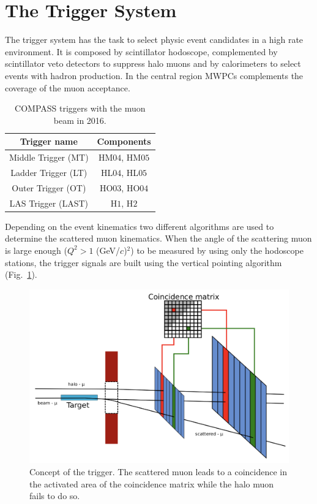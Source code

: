 
\section{The Trigger System}\label{sec:trigger}

The trigger system \cite{TriggerSys} has the task to select physic event candidates in a high rate environment. It is composed by scintillator hodoscope, complemented by scintillator veto detectors to suppress halo muons and by calorimeters to select events with hadron production. In the central region MWPCs complements the coverage of the muon acceptance.

\begin{table}[!h]
  \caption{COMPASS triggers with the muon beam in 2016.}
  \label{tab:kinvar}
  \centering
  \begin{tabularx}{7.5cm}{cc}
    \hline
    \hline
    Trigger name & Components \\
    \hline
    \hline
    Middle Trigger (MT) & HM$04$, HM$05$ \\
    Ladder Trigger (LT) & HL$04$, HL$05$ \\
    Outer Trigger (OT) & HO$03$, HO$04$ \\
    LAS Trigger (LAST) & H$1$, H$2$ \\
    \hline
    \hline
  \end{tabularx}
\end{table}

Depending on the event kinematics two different algorithms are used to determine the scattered muon kinematics. When the angle of the scattering muon is large enough ($Q^2 > 1$ (GeV/$c$)$^2$) to be measured by using only the hodoscope stations, the trigger signals are built using the vertical pointing algorithm (Fig.~\ref{pic:triglogic}).

\begin{figure}[!h]
  \centering
	\includegraphics[scale=0.5]{./gfx/TriggerLogic.png}
	\caption{Concept of the trigger. The scattered muon leads to a coincidence in the activated area of the coincidence matrix while the halo muon fails to do so.}
	\label{pic:triglogic}
\end{figure}

